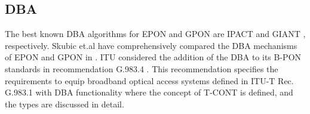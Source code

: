\subsection{\acf{DBA}}
\label{Back:Sec:PON:sub:DBA}






The best known \ac{DBA} algorithms for \ac{EPON} and \ac{GPON} are IPACT \cite{983911} and GIANT \cite{DAC:DAC761}, respectively. Skubic et.al have comprehensively compared the \ac{DBA} mechanisms of \ac{EPON} and \ac{GPON} in \cite{Skubic:2009:CDB:1669975.1669987}. \ac{ITU} considered the addition of the \ac{DBA} to its B-PON standards in recommendation G.983.4 \cite{ITU_g.983.4_nodate}. This recommendation specifies the requirements to equip broadband optical access systems defined in ITU-T Rec. G.983.1 \cite{ITU_g.983.1_nodate} with \ac{DBA} functionality where the concept of \ac{T-CONT} is defined, and the types are discussed in detail.

